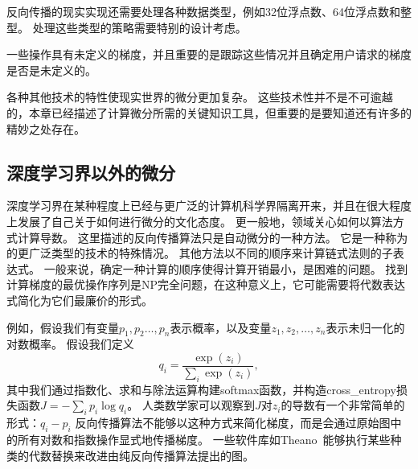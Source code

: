反向传播的现实实现还需要处理各种数据类型，例如32位浮点数、64位浮点数和整型。
处理这些类型的策略需要特别的设计考虑。

一些操作具有未定义的梯度，并且重要的是跟踪这些情况并且确定用户请求的梯度是否是未定义的。

各种其他技术的特性使现实世界的微分更加复杂。 这些技术性并不是不可逾越的，本章已经描述了计算微分所需的关键知识工具，但重要的是要知道还有许多的精妙之处存在。
  
  
\subsection{深度学习界以外的微分}
\label{sec:differentiation_outside_the_deep_learning_community}

深度学习界在某种程度上已经与更广泛的计算机科学界隔离开来，并且在很大程度上发展了自己关于如何进行微分的文化态度。
更一般地，领域关心如何以算法方式计算导数。 
这里描述的反向传播算法只是自动微分的一种方法。 
它是一种称为的更广泛类型的技术的特殊情况。 
其他方法以不同的顺序来计算链式法则的子表达式。 
一般来说，确定一种计算的顺序使得计算开销最小，是困难的问题。 
找到计算梯度的最优操作序列是NP完全问题\citep{Naumann-2008}，在这种意义上，它可能需要将代数表达式简化为它们最廉价的形式。

例如，假设我们有变量$p_1,p_2\ldots,p_n$表示概率，以及变量$z_1,z_2,\ldots,z_n$表示未归一化的对数概率。
假设我们定义
\begin{equation}
  q_i = \frac{\exp(z_i)}{\sum_i \exp(z_i)},
\end{equation}
其中我们通过指数化、求和与除法运算构建softmax函数，并构造\gls{cross_entropy}损失函数$J=-\sum_i p_i\log q_i$。
人类数学家可以观察到$J$对$z_i$的导数有一个非常简单的形式：$q_i-p_i$
反向传播算法不能够以这种方式来简化梯度，而是会通过原始图中的所有对数和指数操作显式地传播梯度。
一些软件库如Theano~\citep{Bergstra-et-al-2010,Bastien-et-al-2012}能够执行某些种类的代数替换来改进由纯反向传播算法提出的图。
  
  
